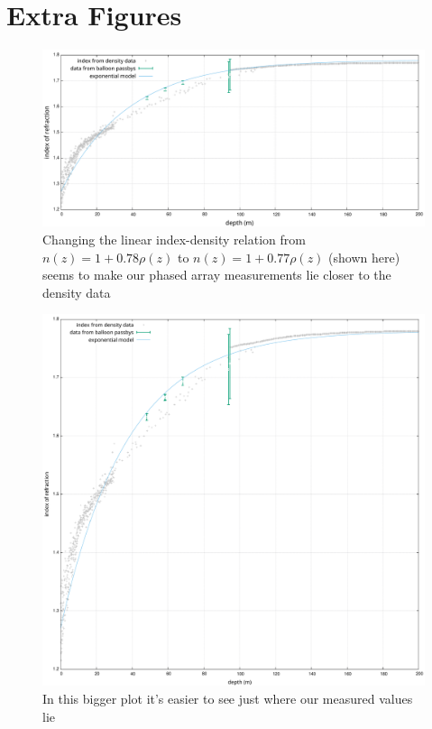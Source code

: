 \chapter{Extra Figures}
\label{app:ExtraFigures}
\begin{figure}[h]
	\centering
	\includegraphics[width=\textwidth]{figures/ResultsOtherLinear.pdf}
  \caption{Changing the linear index-density relation from $n(z) = 1+0.78\rho(z)$ to $n(z) = 1+0.77\rho(z)$ (shown here) seems
to make our phased array measurements lie closer to the density data}
	\label{fig:ResultsOtherLinear}
\end{figure}
\begin{figure}
	\centering
	\includegraphics[width=\textwidth]{figures/ResultsBig.pdf}
  \caption{In this bigger plot it's easier to see just where our measured values lie}
	\label{fig:ResultsBig}
\end{figure}
